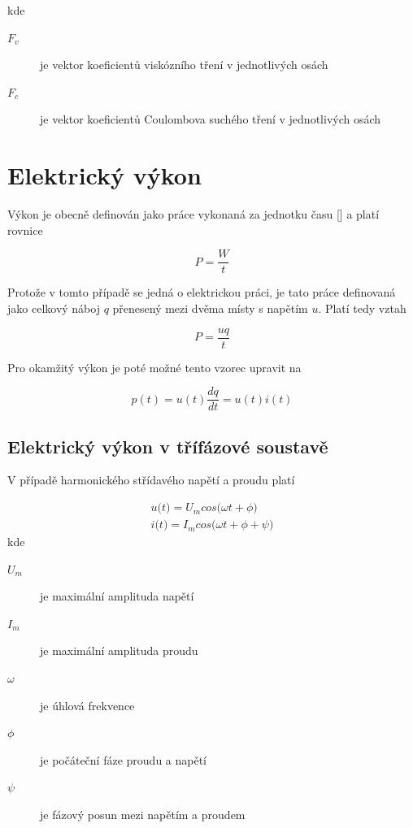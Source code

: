 kde

\begin{description}
\item[$F_v$] je vektor koeficientů viskózního tření v jednotlivých osách
\item[$F_c$] je vektor koeficientů Coulombova suchého tření v jednotlivých osách
\end{description}

\section{Elektrický výkon}
\label{el_vykon_ch}
Výkon je obecně definován jako práce vykonaná za jednotku času [\cite{zemanek}] a platí rovnice

\begin{equation}
P = \frac{W}{t}
\end{equation}

Protože v tomto případě se jedná o elektrickou práci, je tato práce definovaná jako celkový náboj $q$ přenesený mezi dvěma místy s napětím $u$. Platí tedy vztah

\begin{equation}
P = \frac{uq}{t}
\end{equation}

Pro okamžitý výkon je poté možné tento vzorec upravit na

\begin{equation}
p(t) = u(t)\frac{dq}{dt} = u(t)i(t)
\end{equation}

\subsection{Elektrický výkon v třífázové soustavě}

V případě harmonického střídavého napětí a proudu platí

\begin{equation}
\begin{split}
u\big(t\big) = U_m cos\big(\omega t + \phi\big) \\
i\big(t\big) = I_m cos\big(\omega t + \phi + \psi\big)
\end{split}
\label{harm_curr_volt_eq}
\end{equation}  
kde
\begin{description}
\item[$U_m$] je maximální amplituda napětí
\item[$I_m$] je maximální amplituda proudu
\item[$\omega$] je úhlová frekvence
\item[$\phi$] je počáteční fáze proudu a napětí
\item[$\psi$] je fázový posun mezi napětím a proudem
\end{description}

